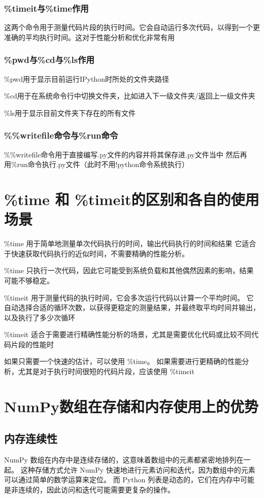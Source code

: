 \documentclass[10pt]{article}
\begin{document}
	\subsubsection{\%timeit与\%time作用}
	这两个命令用于测量代码片段的执行时间。它会自动运行多次代码，以得到一个更准确的平均执行时间。这对于性能分析和优化非常有用
	\subsubsection{\%pwd与\%cd与\%ls作用}
	\%pwd用于显示目前运行IPython时所处的文件夹路径\par
	\%cd用于在系统命令行中切换文件夹，比如进入下一级文件夹/返回上一级文件夹\par
	\%ls用于显示目前文件夹下存在的所有文件
	\subsubsection{\%\%writefile命令与\%run命令}
	\%\%writefile命令用于直接编写.py文件的内容并将其保存进.py文件当中
	然后再用\%run命令执行.py文件（此时不用!python命令系统执行）
	
	\section{\%time 和 \%timeit的区别和各自的使用场景}
	\%time 用于简单地测量单次代码执行的时间，输出代码执行的时间和结果
	它适合于快速获取代码执行的近似时间，不需要精确的性能分析。\par
	\%time 只执行一次代码，因此它可能受到系统负载和其他偶然因素的影响，结果可能不够稳定。\par
	\%timeit 用于测量代码的执行时间，它会多次运行代码以计算一个平均时间。
	它自动选择合适的循环次数，以获得更稳定的测量结果，并最终取平均时间并输出，以及执行了多少次循环\par
	\%timeit 适合于需要进行精确性能分析的场景，尤其是需要优化代码或比较不同代码片段的性能时\par
	如果只需要一个快速的估计，可以使用 \%time。
	如果需要进行更精确的性能分析，尤其是对于执行时间很短的代码片段，应该使用 \%timeit\par
	
	
	
	
	\section{NumPy数组在存储和内存使用上的优势}
	\subsection{内存连续性}NumPy 数组在内存中是连续存储的，这意味着数组中的元素都紧密地排列在一起。
	这种存储方式允许 NumPy 快速地进行元素访问和迭代，因为数组中的元素可以通过简单的数学运算来定位。
	而 Python 列表是动态的，它们在内存中可能是非连续的，因此访问和迭代可能需要更复杂的操作。
\end{document}
